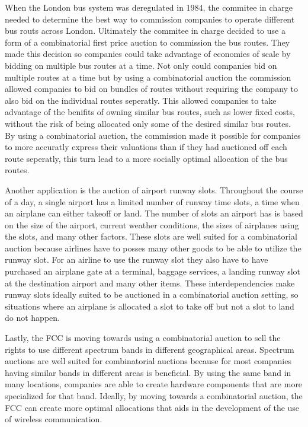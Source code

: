 \documentclass[10pt,onecolumn,letterpaper]{article}
\theoremstyle{definition}
\begin{document}
When the London bus system was deregulated in 1984, the commitee in charge needed to determine the best way to commission companies to operate  different bus routs across London. Ultimately the commitee in charge decided to use a form of a combinatorial first price auction to commission the bus routes. They made this decision so companies could take advantage of economies of scale by bidding on multiple bus routes at a time. Not only could companies bid on multiple routes at a time but by using a combinatorial auction the commission allowed companies to bid on bundles of routes without requiring the company to also bid on the individual routes seperatly. This allowed companies to take advantage of the benifits of owning similar bus routes, such as lower fixed costs, without the risk of being allocated only some of the desired similar bus routes. By using a combinatorial auction, the commission made it possible for companies to more accuratly express their valuations than if they had auctioned off each route seperatly, this turn lead to a more socially optimal allocation of the bus routes.

Another application is the auction of airport runway slots. Throughout the course of a day, a single airport has a limited number of runway time slots, a time when an airplane can either takeoff or land. The number of slots an airport has is based on the size of the airport, current weather conditions, the sizes of airplanes using the slots, and many other factors. These slots are well suited for a combinatorial auction because airlines have to posses many other goods to be able to utilize the runway slot. For an airline to use the runway slot they also have to have purchased an airplane gate at a terminal, baggage services, a landing runway slot at the destination airport and many other items. These interdependencies make runway slots ideally suited to be auctioned in a combinatorial auction setting, so situations where an airplane is allocated a slot to take off but not a slot to land do not happen.

Lastly, the FCC is moving towards using a combinatorial auction to sell the rights to use different spectrum bands in different geographical areas. Spectrum auctions are well suited for combinatorial auctions because for most companies having similar bands in different areas is beneficial. By using the same band in many locations, companies are able to create hardware components that are more specialized for that band. Ideally, by moving towards a combinatorial auction, the FCC can create more optimal allocations that aids in the development of the use of wireless communication.
\end{document}
